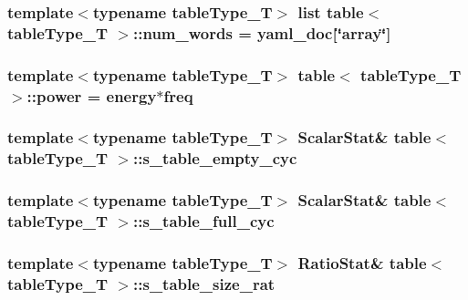 \label{classtable_a64c900658131e38359a1f39fe0f2d489}
\hypertarget{classtable_a1e48c66312066107052dac253aaedf6d}{
\subsubsection[{num\_\-words}]{\setlength{\rightskip}{0pt plus 5cm}template$<$typename tableType\_\-T$>$ list {\bf table}$<$ tableType\_\-T $>$::{\bf num\_\-words} = {\bf yaml\_\-doc}\mbox{[}\char`\"{}array\char`\"{}\mbox{]}}}
\label{classtable_a1e48c66312066107052dac253aaedf6d}
\hypertarget{classtable_a1ea493d4d5072b1d255e0d25d10f9cab}{
\subsubsection[{power}]{\setlength{\rightskip}{0pt plus 5cm}template$<$typename tableType\_\-T$>$ {\bf table}$<$ tableType\_\-T $>$::{\bf power} = {\bf energy}$\ast${\bf freq}}}
\label{classtable_a1ea493d4d5072b1d255e0d25d10f9cab}
\hypertarget{classtable_a55b2044ce2664c572a3ad3bd658dcbfe}{
\subsubsection[{s\_\-table\_\-empty\_\-cyc}]{\setlength{\rightskip}{0pt plus 5cm}template$<$typename tableType\_\-T$>$ {\bf ScalarStat}\& {\bf table}$<$ tableType\_\-T $>$::{\bf s\_\-table\_\-empty\_\-cyc}}}
\label{classtable_a55b2044ce2664c572a3ad3bd658dcbfe}
\hypertarget{classtable_ab2e2f8d83bb377b91a283abcb90a36a7}{
\subsubsection[{s\_\-table\_\-full\_\-cyc}]{\setlength{\rightskip}{0pt plus 5cm}template$<$typename tableType\_\-T$>$ {\bf ScalarStat}\& {\bf table}$<$ tableType\_\-T $>$::{\bf s\_\-table\_\-full\_\-cyc}}}
\label{classtable_ab2e2f8d83bb377b91a283abcb90a36a7}
\hypertarget{classtable_a9535b93bb57e405b922fb45afdb75ad0}{
\subsubsection[{s\_\-table\_\-size\_\-rat}]{\setlength{\rightskip}{0pt plus 5cm}template$<$typename tableType\_\-T$>$ {\bf RatioStat}\& {\bf table}$<$ tableType\_\-T $>$::{\bf s\_\-table\_\-size\_\-rat}}}
